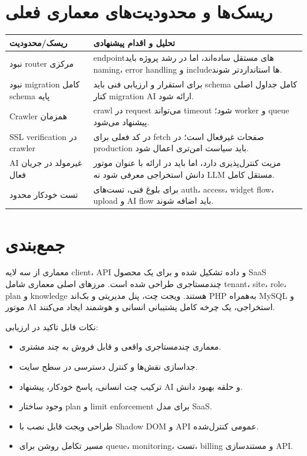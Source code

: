 \documentclass[12pt,a4paper]{article}
\newcommand{\en}[1]{\lr{#1}}
\begin{document}
\section{ریسک‌ها و محدودیت‌های معماری فعلی}
\begin{longtable}{>{\raggedleft\arraybackslash}p{4cm} p{10.5cm}}
\toprule
\textbf{ریسک/محدودیت} & \textbf{تحلیل و اقدام پیشنهادی} \\
\midrule
نبود router مرکزی & endpointهای مستقل ساده‌اند، اما در رشد پروژه باید naming، error handling و includeها استانداردتر شوند. \\
نبود migration کامل schema پایه & برای استقرار و ارزیابی فنی باید schema کامل جداول اصلی کنار migration AI ارائه شود. \\
Crawler همزمان & crawl در request می‌تواند timeout شود؛ worker و queue پیشنهاد می‌شود. \\
SSL verification در crawler & در کد فعلی برای fetch صفحات غیرفعال است؛ در production باید سیاست امن‌تری اعمال شود. \\
AI غیرمولد در جریان فعال & مزیت کنترل‌پذیری دارد، اما باید در ارائه با عنوان موتور دانش استخراجی معرفی شود نه LLM مستقل کامل. \\
تست خودکار محدود & برای بلوغ فنی، تست‌های auth، access، widget flow، upload و AI flow باید اضافه شوند. \\
\bottomrule
\end{longtable}

\section{جمع‌بندی}
معماری \en{AI Chat SaaS} از سه لایه client، API و داده تشکیل شده و برای یک محصول SaaS چندمستاجری طراحی شده است. مرزهای اصلی معماری شامل tenant، site، role، plan و knowledge هستند. ویجت چت، پنل مدیریتی و بک‌اند PHP به‌همراه MySQL و موتور AI استخراجی، یک چرخه کامل پشتیبانی انسانی و هوشمند ایجاد می‌کنند.

نکات قابل تاکید در ارزیابی:
\begin{itemize}
  \item معماری چندمستاجری واقعی و قابل فروش به چند مشتری.
  \item جداسازی نقش‌ها و کنترل دسترسی در سطح سایت.
  \item ترکیب چت انسانی، پاسخ خودکار، پیشنهاد AI و حلقه بهبود دانش.
  \item وجود ساختار plan و limit enforcement برای مدل SaaS.
  \item طراحی ویجت قابل نصب با Shadow DOM و API عمومی کنترل‌شده.
  \item مسیر تکامل روشن برای queue، monitoring، تست، billing و مستندسازی API.
\end{itemize}
\end{document}
